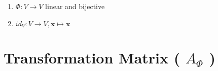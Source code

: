 \begin{enumerate}
    \item 
    \begin{definition}[Automorphism]
        $\Phi : V \to V$ linear and bijective
        \hfill \cite{mfml/book/mml/Deisenroth-Faisal-Ong}
    \end{definition}

    \item 
    \begin{definition}
        $id_V : V \to V , \bm{x} \mapsto \bm{x}$
        \hfill \cite{mfml/book/mml/Deisenroth-Faisal-Ong}
    \end{definition}
\end{enumerate}



















\section{Transformation Matrix ( $A_\Phi$ )}

